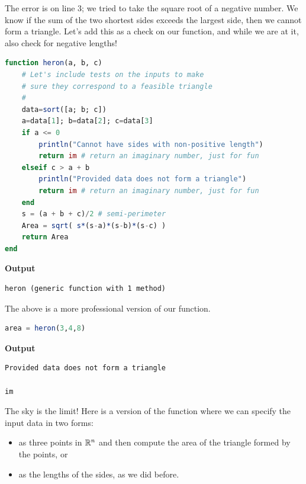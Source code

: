 The error is on line 3; we tried to take the square root of a negative number. We know if the sum of the two shortest sides exceeds the largest side, then we cannot form a triangle. Let's add this as a check on our function, and while we are at it, also check for negative lengths!\\ 

\begin{lstlisting}[language=Julia,style=mystyle]
function heron(a, b, c)
    # Let's include tests on the inputs to make
    # sure they correspond to a feasible triangle
    #
    data=sort([a; b; c])
    a=data[1]; b=data[2]; c=data[3]
    if a <= 0
        println("Cannot have sides with non-positive length")
        return im # return an imaginary number, just for fun
    elseif c > a + b
        println("Provided data does not form a triangle")
        return im # return an imaginary number, just for fun
    end
    s = (a + b + c)/2 # semi-perimeter
    Area = sqrt( s*(s-a)*(s-b)*(s-c) )
    return Area
end
\end{lstlisting}
\textbf{Output} 
\begin{verbatim}
heron (generic function with 1 method)
\end{verbatim}

The above is a more professional version of our function. \\

\begin{lstlisting}[language=Julia,style=mystyle]
area = heron(3,4,8)
\end{lstlisting}
\textbf{Output} 
\begin{verbatim}
Provided data does not form a triangle

im
\end{verbatim}

The sky is the limit! Here is a version of the function where we can specify the input data in two forms:
\begin{itemize}
    \item as three points in $\mathbb R^n$ and then compute the area of the triangle formed by the points, or
    \item as the lengths of the sides, as we did before.
\end{itemize}


